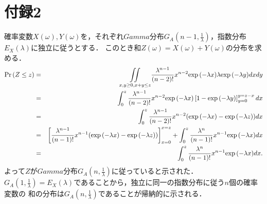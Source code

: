 \documentclass[a4j,papersize,disablejfam,slide,14pt]{jsarticle}
\def\exp#1{\mbox{${\rm exp} \left( #1 \right)$}} %
\def\prob#1{\mbox{${\rm Pr} \left( #1 \right)$}} %
\begin{document}
\section{付録2}
	確率変数$X(\omega),Y(\omega)$を，それぞれ$Gamma$分布$G_A(n-1, \frac{1}{\lambda})$，指数分布$E_X(\lambda)$に独立に従うとする．
    このとき和$Z(\omega) = X(\omega) + Y(\omega)$の分布を求める．
    \begin{eqnarray}
    	\prob{Z \leq z} &=& \underset{x,y \geq 0, x + y \leq z}{\iint} \frac{\lambda^{n-1}}{(n-2)!}x^{n-2}\exp{-\lambda x} \lambda \exp{-\lambda y} dxdy \\
        &=& \int_{0}^{z} \frac{\lambda^{n-1}}{(n-2)!}x^{n-2}\exp{-\lambda x} \left[ 1 - \exp{-\lambda y} \right]_{y=0}^{y = z - x} dx \\
        &=& \int_{0}^{z} \frac{\lambda^{n-1}}{(n-2)!}x^{n-2}(\exp{-\lambda x} - \exp{-\lambda z}) dx \\
        &=& \left[ \frac{\lambda^{n-1}}{(n-1)!}x^{n-1}(\exp{-\lambda x} - \exp{-\lambda z}) \right]_{x=0}^{x=z} + \int_{0}^{z} \frac{\lambda^n}{(n-1)!}x^{n-1}\exp{-\lambda x} dx \\
        &=& \int_{0}^{z} \frac{\lambda^n}{(n-1)!}x^{n-1}\exp{-\lambda x} dx.
    \end{eqnarray}
    よって$Z$が$Gamma$分布$G_A(n, \frac{1}{\lambda})$に従っていると示された．$G_A(1, \frac{1}{\lambda}) = E_X(\lambda)$であることから，独立に同一の指数分布に従う$n$個の確率変数の
    和の分布は$G_A(n, \frac{1}{\lambda})$であることが帰納的に示される．
\end{document}
